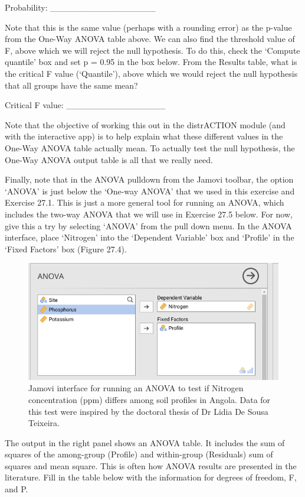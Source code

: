 \documentclass[
]{scrbook}
\begin{document}
Probability: \_\_\_\_\_\_\_\_\_\_\_\_\_\_\_\_\_

Note that this is the same value (perhaps with a rounding error) as the p-value from the One-Way ANOVA table above.
We can also find the threshold value of F, above which we will reject the null hypothesis.
To do this, check the `Compute quantile' box and set p = 0.95 in the box below.
From the Results table, what is the critical F value (`Quantile'), above which we would reject the null hypothesis that all groups have the same mean?

Critical F value: \_\_\_\_\_\_\_\_\_\_\_\_\_\_\_\_

Note that the objective of working this out in the distrACTION module (and with the interactive app) is to help explain what these different values in the One-Way ANOVA table actually mean.
To actually test the null hypothesis, the One-Way ANOVA output table is all that we really need.

Finally, note that in the ANOVA pulldown from the Jamovi toolbar, the option `ANOVA' is just below the `One-way ANOVA' that we used in this exercise and Exercise 27.1.
This is just a more general tool for running an ANOVA, which includes the two-way ANOVA that we will use in Exercise 27.5 below.
For now, give this a try by selecting `ANOVA' from the pull down menu.
In the ANOVA interface, place `Nitrogen' into the `Dependent Variable' box and `Profile' in the `Fixed Factors' box (Figure 27.4).

\begin{figure}
\includegraphics[width=1\linewidth]{img/jamovi_ANOVA_input} \caption{Jamovi interface for running an ANOVA to test if Nitrogen concentration (ppm) differs among soil profiles in Angola. Data for this test were inspired by the doctoral thesis of Dr Lidia De Sousa Teixeira.}\label{fig:unnamed-chunk-128}
\end{figure}

The output in the right panel shows an ANOVA table.
It includes the sum of squares of the among-group (Profile) and within-group (Residuals) sum of squares and mean square.
This is often how ANOVA results are presented in the literature.
Fill in the table below with the information for degrees of freedom, F, and P.
\end{document}
